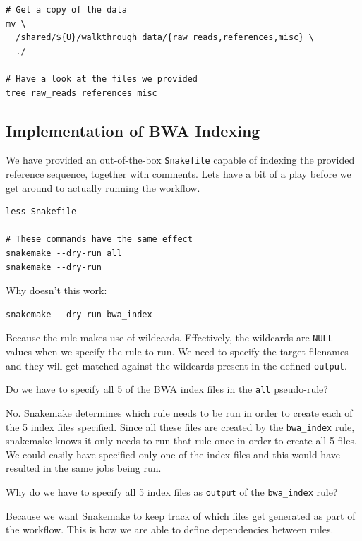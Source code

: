 \begin{lstlisting}
# Get a copy of the data
mv \
  /shared/${U}/walkthrough_data/{raw_reads,references,misc} \
  ./

# Have a look at the files we provided
tree raw_reads references misc
\end{lstlisting}

\subsection{Implementation of BWA Indexing}

We have provided an out-of-the-box \texttt{Snakefile} capable of indexing the provided reference sequence, together with comments.
Lets have a bit of a play before we get around to actually running the workflow.

\begin{lstlisting}
less Snakefile

# These commands have the same effect
snakemake --dry-run all
snakemake --dry-run
\end{lstlisting}


\begin{questions}

Why doesn't this work:

\begin{lstlisting}
snakemake --dry-run bwa_index
\end{lstlisting}

\begin{answer}

Because the rule makes use of wildcards.
Effectively, the wildcards are \texttt{NULL} values when we specify the rule to run. We need to specify the target filenames and they will get matched against the wildcards present in the defined \texttt{output}.

\end{answer}

Do we have to specify all 5 of the BWA index files in the \texttt{all} pseudo-rule?

\begin{answer}

No.
Snakemake determines which rule needs to be run in order to create each of the 5 index files specified.
Since all these files are created by the \texttt{bwa\_index} rule, snakemake knows it only needs to run that rule once in order to create all 5 files.
We could easily have specified only one of the index files and this would have resulted in the same jobs being run.

\end{answer}

Why do we have to specify all 5 index files as \texttt{output} of the \texttt{bwa\_index} rule?

\begin{answer}

Because we want Snakemake to keep track of which files get generated as part of the workflow.
This is how we are able to define dependencies between rules.

\end{answer}

\end{questions}


